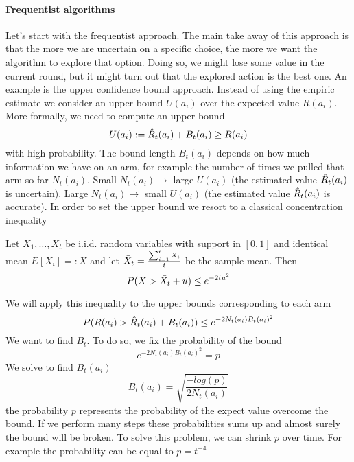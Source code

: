 \documentclass[../main.tex]{subfiles}
\begin{document}
\paragraph{Frequentist algorithms}
Let's start with the frequentist approach. The main take away of this approach is that the more we are uncertain on a specific choice, the more we want the algorithm to explore that option. Doing so, we might lose some value in the current round, but it might turn out that the explored action is the best one. An example is the upper confidence bound approach. Instead of using the empiric estimate we consider an upper bound $U(a_i)$
over the expected value $R(a_i)$. More formally, we need to compute an upper bound
\begin{equation*}
    U(a_i) := \Hat{R}_t(a_i) + B_t(a_i) \geq R(a_i)
\end{equation*}
with high probability. The bound length $B_t(a_i)$ depends on how much information we have on an arm, for example the number of times we pulled that arm so far $N_t(a_i)$.
Small $N_t(a_i) \rightarrow$ large $U(a_i)$ (the estimated value $\Hat{R}_t(a_i)$ is uncertain). Large $N_t(a_i) \rightarrow$ small $U(a_i)$ (the estimated value $\Hat{R}_t(a_i)$ is accurate).
In order to set the upper bound we resort to a classical concentration inequality
\begin{definition}
    Let $X_1,\dots,X_t$ be i.i.d. random variables with support in $[0, 1]$ and identical mean $E[X_i] =: X$ and let $\Bar{X}_t=\frac{\sum_{i=1}^t X_i}{t}$ be the sample mean. Then
    \begin{equation*}
        P(X > \Bar{X}_t + u) \leq e^{-2tu^2}
    \end{equation*}
\end{definition}
\par \noindent
We will apply this inequality to the upper bounds corresponding to each arm
\begin{equation}
    P(R(a_i) > \Hat{R}_t(a_i) + B_t(a_i)) \leq e^{-2N_t(a_i)B_t(a_i)^2}
\end{equation}
We want to find $B_t$. To do so, we fix the probability of the bound
\begin{equation*}
    e^{-2N_t(a_i)B_t(a_i)^2} = p
\end{equation*}
We solve to find $B_t(a_i)$
\begin{equation*}
    B_t(a_i) = \sqrt{\frac{-log(p)}{2N_t(a_i)}}
\end{equation*}
the probability $p$ represents the probability of the expect value overcome the bound. If we perform many steps these probabilities sums up and almost surely the bound will be broken. To solve this problem, we can shrink $p$ over time. For example the probability can be equal to $p=t^{-4}$
\end{document}

